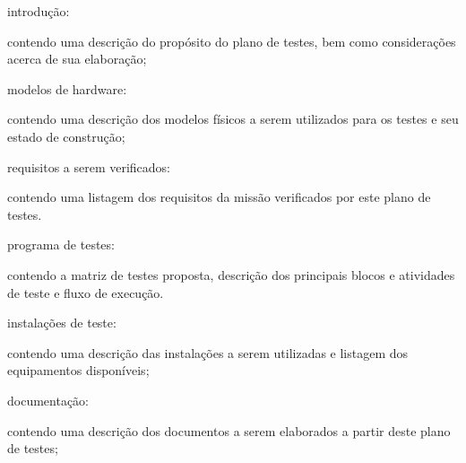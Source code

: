 \begin{alineas}
    \item introdução:
    \begin{alineas}
        \item contendo uma descrição do propósito do plano de testes, bem como considerações acerca de sua elaboração;
    \end{alineas}

    \item modelos de hardware:
    \begin{alineas}
        \item contendo uma descrição dos modelos físicos a serem utilizados para os testes e seu estado de construção;
    \end{alineas}

    \item requisitos a serem verificados:
    \begin{alineas}
        \item contendo uma listagem dos requisitos da missão verificados por este plano de testes.
    \end{alineas}

    \item programa de testes:
    \begin{alineas}
        \item contendo a matriz de testes proposta, descrição dos principais blocos e atividades de teste e fluxo de execução.
    \end{alineas}

    \item instalações de teste:
    \begin{alineas}
        \item contendo uma descrição das instalações a serem utilizadas e listagem dos equipamentos disponíveis;
    \end{alineas}

    \item documentação:
    \begin{alineas}
        \item contendo uma descrição dos documentos a serem elaborados a partir deste plano de testes;
    \end{alineas}

\end{alineas}